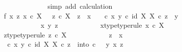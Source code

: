 \begin{isabellebody}
\ \ \ \ \ \ \ \ \ \ \ \ \isamarkupfalse%
\ {\isacharparenleft}{\kern0pt}simp\ add{\isacharcolon}{\kern0pt}\ calculation{\isacharparenright}{\kern0pt}\isanewline
\ \ \ \ \ \ \ \ \isamarkupfalse%
\isanewline
\ \ \ \ \ \ \isanewline
\ \ \isanewline
\ \ \isanewline
\ \ \isanewline
\ \ \ \ \ \ \ \ \isamarkupfalse%
\ f{}{\isacharcolon}{\kern0pt}\ {\isachardoublequoteopen}{\isasymAnd}x\ z{\isachardot}{\kern0pt}\ x\ {\isasymin}\isactrlsub c\ X\ {\isasymLongrightarrow}\ \ z\ {\isasymin}\isactrlsub c\ X\ {\isasymLongrightarrow}\ z\ {\isasymnoteq}\ x\ {\isasymLongrightarrow}\ \ {\isacharparenleft}{\kern0pt}{\isasymTheta}\ {\isasymcirc}\isactrlsub c\ {\isasymlangle}x{\isacharcomma}{\kern0pt}\ y{}{\isasymrangle}{\isacharparenright}{\kern0pt}\isactrlsup {\isasymflat}\ {\isasymcirc}\isactrlsub c\ {\isasymlangle}id\ X{\isacharcomma}{\kern0pt}\ {\isasymbeta}\isactrlbsub X\isactrlesub {\isasymrangle}\ {\isasymcirc}\isactrlsub c\ z\ {\isacharequal}{\kern0pt}\ y{}{\isachardoublequoteclose}\isanewline
\ \ \ \ \ \ \ \ \isamarkupfalse%
\ {\isacharminus}{\kern0pt}\ \isanewline
\ \ \ \ \ \ \ \ \ \ \isamarkupfalse%
\ x\ y\ z\isanewline
\ \ \ \ \ \ \ \ \ \ \isamarkupfalse%
\ x{\isacharunderscore}{\kern0pt}type{\isacharbrackleft}{\kern0pt}type{\isacharunderscore}{\kern0pt}rule{\isacharbrackright}{\kern0pt}{\isacharcolon}{\kern0pt}\ {\isachardoublequoteopen}x\ {\isasymin}\isactrlsub c\ X{\isachardoublequoteclose}\isanewline
\ \ \ \ \ \ \ \ \ \ \isamarkupfalse%
\ z{\isacharunderscore}{\kern0pt}type{\isacharbrackleft}{\kern0pt}type{\isacharunderscore}{\kern0pt}rule{\isacharbrackright}{\kern0pt}{\isacharcolon}{\kern0pt}\ {\isachardoublequoteopen}z\ {\isasymin}\isactrlsub c\ X{\isachardoublequoteclose}\isanewline
\ \ \ \ \ \ \ \ \ \ \isamarkupfalse%
\ {\isachardoublequoteopen}z\ {\isasymnoteq}\ x{\isachardoublequoteclose}\isanewline
\ \ \ \ \ \ \ \ \ \ \isamarkupfalse%
\ {\isachardoublequoteopen}{\isacharparenleft}{\kern0pt}{\isasymTheta}\ {\isasymcirc}\isactrlsub c\ {\isasymlangle}x{\isacharcomma}{\kern0pt}\ y{}{\isasymrangle}{\isacharparenright}{\kern0pt}\isactrlsup {\isasymflat}\ {\isasymcirc}\isactrlsub c\ {\isasymlangle}id\ X{\isacharcomma}{\kern0pt}\ {\isasymbeta}\isactrlbsub X\isactrlesub {\isasymrangle}\ {\isasymcirc}\isactrlsub c\ z\ {\isacharequal}{\kern0pt}\ into\ {\isasymcirc}\isactrlsub c\ \ \ {\isasymlangle}y{}{\isacharcomma}{\kern0pt}\ {\isasymlangle}x{\isacharcomma}{\kern0pt}\ z{\isasymrangle}{\isasymrangle}{\isachardoublequoteclose}\isanewline

\end{isabellebody}
